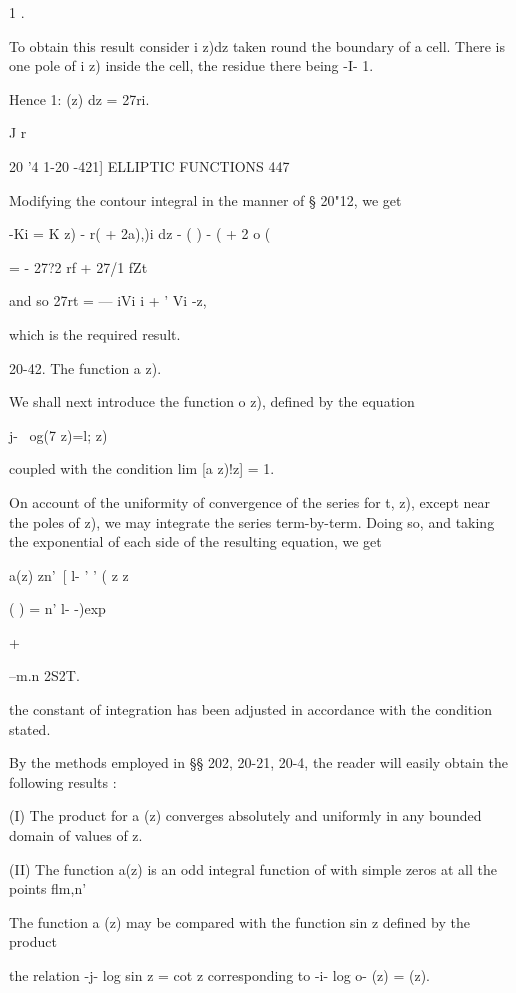 {1 . 

To obtain this result consider i  z)dz taken round the boundary of a 
cell. There is one pole of i  z) inside the cell, the residue there being -I- 1. 

Hence 1:  (z) dz  = 27ri. 

J r 



20 '4 1-20 -421] ELLIPTIC FUNCTIONS 447 

Modifying the contour integral in the manner of § 20"12, we get 

 -Ki =  K z) - r(  + 2a),)i dz -    ( ) -  (  + 2 o  (  

= - 27?2 rf  + 27/1 fZt 

and so 27rt = —  iVi i + ' Vi -z, 

which is the required result. 

20-42. The function a z). 

We shall next introduce the function o  z), defined by the equation 

j- \ og(7 z)=l; z) 

coupled with the condition lim [a z)!z] = 1. 

On account of the uniformity of convergence of the series for t, z), except 
near the poles of   z), we may integrate the series term-by-term. Doing so, 
and taking the exponential of each side of the resulting equation, we get 

a(z) zn'\ [ l- '  ' ( z z  



( ) =  n' l- -)exp 



+ 



--m.n 2S2T. 



the constant of integration has been adjusted in accordance with the condition 
stated. 

By the methods employed in §§ 202, 20-21, 20-4, the reader will easily 
obtain the following results : 

(I) The product for a (z) converges absolutely and uniformly in any 
bounded domain of values of z. 

(II) The function a(z) is an odd integral function of   with simple zeros 
at all the points flm,n' 

The function a (z) may be compared with the function sin z defined by 
the product 

the relation -j- log sin z = cot z corresponding to -i- log o- (z) =  (z). 

}
